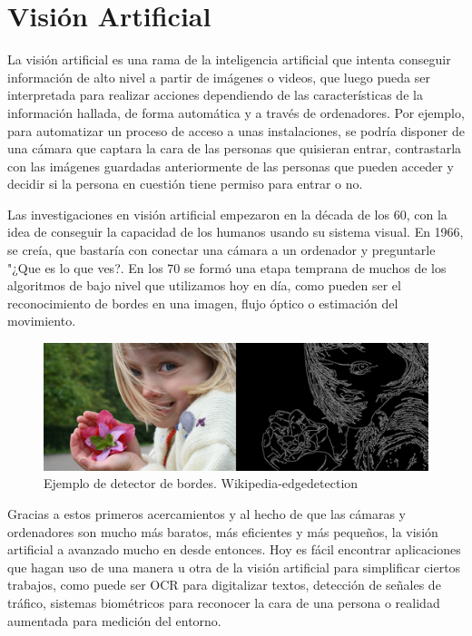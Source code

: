 \documentclass[a4paper, 12pt]{book}
\begin{document}
\section{Visión Artificial}
\label{sec:visionartificial}

La visión artificial es una rama de la inteligencia artificial que intenta conseguir información de alto nivel a partir de imágenes o videos, que luego pueda ser interpretada para realizar acciones dependiendo de las características de la información hallada, de forma automática y a través de ordenadores. Por ejemplo, para automatizar un proceso de acceso a unas instalaciones, se podría disponer de una cámara que captara la cara de las personas que quisieran entrar, contrastarla con las imágenes guardadas anteriormente de las personas que pueden acceder y decidir si la persona en cuestión tiene permiso para entrar o no.

Las investigaciones en visión artificial empezaron en la década de los 60, con la idea de conseguir la capacidad de los humanos usando su sistema visual. En 1966, se creía, que bastaría con conectar una cámara a un ordenador y preguntarle "¿Que es lo que ves?. En los 70 se formó una etapa temprana de muchos de los algoritmos de bajo nivel que utilizamos hoy en día, como pueden ser el reconocimiento de bordes en una imagen, flujo óptico o estimación del movimiento.

\begin{figure}[ht]
\centering
\includegraphics[scale=0.8]{img/edge_detection.png}%
\caption{Ejemplo de detector de bordes. Wikipedia-edgedetection}%
\end{figure}

Gracias a estos primeros acercamientos y al hecho de que las cámaras y ordenadores son mucho más baratos, más eficientes y más pequeños, la visión artificial a avanzado mucho en desde entonces. Hoy es fácil encontrar aplicaciones que hagan uso de una manera u otra de la visión artificial para simplificar ciertos trabajos, como puede ser OCR para digitalizar textos, detección de señales de tráfico, sistemas biométricos para reconocer la cara de una persona o realidad aumentada para medición del entorno.
\end{document}
